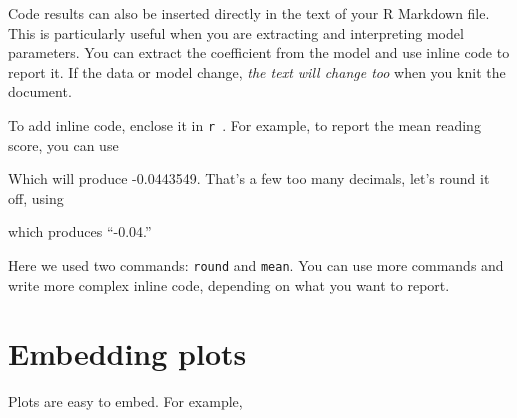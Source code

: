 \documentclass[
  letterpaper,
  DIV=11,
  numbers=noendperiod]{scrreprt}
\newenvironment{Shaded}{\begin{snugshade}}{\end{snugshade}}
\newcommand{\AttributeTok}[1]{\textcolor[rgb]{0.49,0.56,0.16}{#1}}
\newcommand{\StringTok}[1]{\textcolor[rgb]{0.25,0.44,0.63}{#1}}
\begin{document}
Code results can also be inserted directly in the text of your R
Markdown file. This is particularly useful when you are extracting and
interpreting model parameters. You can extract the coefficient from the
model and use inline code to report it. If the data or model change,
\emph{the text will change too} when you knit the document.

To add inline code, enclose it in
\texttt{\textasciigrave{}r\ \textasciigrave{}}. For example, to report
the mean reading score, you can use

\begin{Shaded}
\end{Shaded}

Which will produce -0.0443549. That's a few too many decimals, let's
round it off, using

\begin{Shaded}
\end{Shaded}

which produces ``-0.04.''

Here we used two commands: \texttt{round} and \texttt{mean}. You can use
more commands and write more complex inline code, depending on what you
want to report.

\hypertarget{embedding-plots}{%
\section{Embedding plots}\label{embedding-plots}}

Plots are easy to embed. For example,
\end{document}
